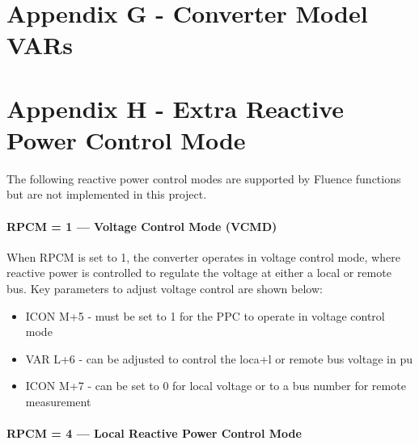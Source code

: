 \documentclass{../grid-link-report}
\begin{document}
	\chapter{Appendix G - Converter Model VARs}
	
	\chapter{Appendix H - Extra Reactive Power Control Mode}	

	The following reactive power control modes are supported by Fluence functions but are not implemented in this project.
	\subsubsection{RPCM = 1 — Voltage Control Mode (VCMD)}	
	
	When RPCM is set to 1, the converter operates in voltage control mode, where reactive power is controlled to regulate the voltage at either a local or remote bus. Key parameters to adjust voltage control are shown below:
	
	\begin{itemize}
		\item ICON M+5 - must be set to 1 for the PPC to operate in voltage control mode
		\item VAR L+6 - can be adjusted to control the loca+l or remote bus voltage in pu
		\item ICON M+7 - can be set to 0 for local voltage or to a bus number for remote measurement
	\end{itemize} 
	
	\subsubsection{RPCM = 4 — Local Reactive Power Control Mode}
\end{document}
